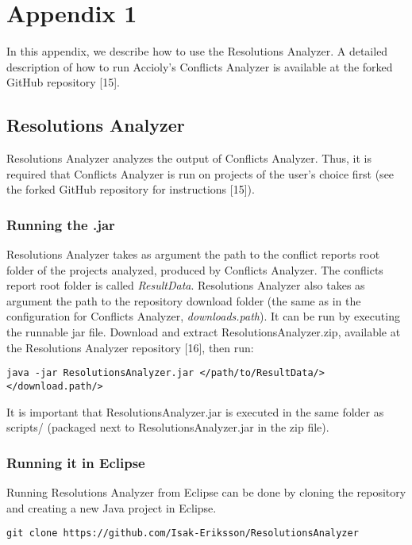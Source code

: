 \chapter{Appendix 1}
In this appendix, we describe how to use the Resolutions Analyzer. A detailed description of how to run Accioly’s Conflicts Analyzer is available at the forked GitHub repository [15].

\section{Resolutions Analyzer}
Resolutions Analyzer analyzes the output of Conflicts Analyzer. Thus, it is required that Conflicts Analyzer is run on projects of the user's choice first (see the forked GitHub repository for instructions [15]).

\subsection{Running the .jar}
Resolutions Analyzer takes as argument the path to the conflict reports root folder of the projects analyzed, produced by Conflicts Analyzer. The conflicts report root folder is called \textit{ResultData}. Resolutions Analyzer also takes as argument the path to the repository download folder (the same as in the configuration for Conflicts Analyzer, \textit{downloads.path}). It can be run by executing the runnable jar file. Download and extract ResolutionsAnalyzer.zip, available at the Resolutions Analyzer repository [16], then run:
\lstset{language=Bash,xleftmargin=2em,frame=single,framexleftmargin=1.5em}
\begin{lstlisting}[frame=single,breaklines=true,tabsize=2]
java -jar ResolutionsAnalyzer.jar </path/to/ResultData/> </download.path/>
\end{lstlisting}
It is important that ResolutionsAnalyzer.jar is executed in the same folder as scripts/ (packaged next to ResolutionsAnalyzer.jar in the zip file).

\subsection{Running it in Eclipse}
Running Resolutions Analyzer from Eclipse can be done by cloning the repository and creating a new Java project in Eclipse. 
\lstset{language=Bash,xleftmargin=2em,frame=single,framexleftmargin=1.5em}
\begin{lstlisting}[frame=single,breaklines=true,tabsize=2]
git clone https://github.com/Isak-Eriksson/ResolutionsAnalyzer
\end{lstlisting}

